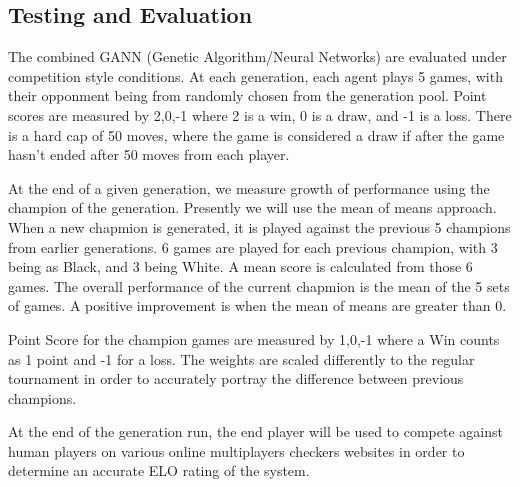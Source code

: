 \documentclass[12pt,a4paper]{article}
\begin{document}
\subsection*{Testing and Evaluation}
The combined GANN (Genetic Algorithm/Neural Networks) are evaluated under competition style conditions. At each generation, each agent plays 5 games, with their opponment being from randomly chosen from the generation pool. Point scores are measured by {2,0,-1} where 2 is a win, 0 is a draw, and -1 is a loss. There is a hard cap of 50 moves, where the game is considered a draw if after the game hasn't ended after 50 moves from each player.

At the end of a given generation, we measure growth of performance using the champion of the generation. Presently we will use the mean of means approach. When a new chapmion is generated, it is played against the previous 5 champions from earlier generations. 6 games are played for each previous champion, with 3 being as Black, and 3 being White. A mean score is calculated from those 6 games. The overall performance of the current chapmion is the mean of the 5 sets of games. A positive improvement is when the mean of means are greater than 0. 

Point Score for the champion games are measured by {1,0,-1} where a Win counts as 1 point and -1 for a loss. The weights are scaled differently to the regular tournament in order to accurately portray the difference between previous champions.

At the end of the generation run, the end player will be used to compete against human players on various online multiplayers checkers websites in order to determine an accurate ELO rating of the system.


\end{document}
